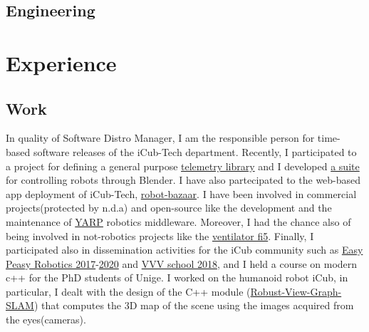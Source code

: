 \documentclass[10pt,a4paper]{moderncv}
\begin{document}
\subsection{Engineering}
\newpage
\section{Experience}
\subsection{Work}
{
In quality of Software Distro Manager, I am the responsible person for time-based software releases of the iCub-Tech department.
Recently, I participated to a project for defining a general purpose \href{https://github.com/robotology/yarp-telemetry}{telemetry library} and I developed \href{https://github.com/robotology/blender-robotics-utils}{a suite} for controlling robots through Blender.
I have also partecipated to the web-based app deployment of iCub-Tech, \href{https://robot-bazaar.iit.it}{robot-bazaar}.}
{I have been involved in commercial projects(protected by n.d.a) and open-source like the development and the maintenance of \href{https://github.com/robotology/yarp}{YARP} robotics middleware.
Moreover, I had the chance also of being involved in not-robotics projects like the \href{https://github.com/icub-tech-iit/ventilator-fi5}{ventilator fi5}.
Finally, I participated also in dissemination activities for the iCub community such as \href{https://easy-peasy-robotics.github.io/editions/mfr17/course-program.html}{Easy Peasy Robotics 2017}-\href{https://easy-peasy-robotics.github.io/editions/web20/course-program.html}{2020}
and \href{http://www.icub.org/school/2018}{VVV school 2018}, and I held a course on modern c++ for the PhD students of Unige.}
{I worked on the humanoid robot iCub, in particular, I dealt with the design of the C++ module (\href{https://github.com/robotology-playground/Robust-View-Graph-SLAM}{Robust-View-Graph-SLAM}) that computes the 3D map of the scene using the images acquired from the eyes(cameras).}
\end{document}
